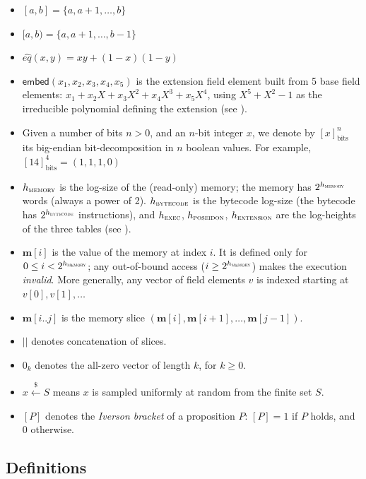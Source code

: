 \documentclass{article}
\theoremstyle{definition}
\begin{document}
\begin{itemize}
    \item $[a, b] = \{a, a + 1, \ldots, b\}$
    \item $[a, b) = \{a, a + 1, \ldots, b-1\}$
    \item $\hat{eq}(x, y) = x y + (1 - x)(1 - y)$
    \item \label{sec:preliminaries-embed} $\mathsf{embed}(x_1, x_2, x_3, x_4, x_5)$ is the extension field element built from 5 base field elements: $x_1 + x_2 X + x_3 X^2 + x_4 X^3 + x_5 X^4$, using $X^5 + X^2 - 1$ as the irreducible polynomial defining the extension (see ).
    \item Given a number of bits $n > 0$, and an $n$-bit integer $x$, we denote by $[x]_\text{bits}^n$ its big-endian bit-decomposition in $n$ boolean values. For example, $[14]_\text{bits}^4 = (1, 1, 1, 0)$
    \item $h_\textsc{memory}$ is the log-size of the (read-only) memory; the memory has $2^{h_\textsc{memory}}$ words (always a power of 2). $h_\textsc{bytecode}$ is the bytecode log-size (the bytecode has $2^{h_\textsc{bytecode}}$ instructions), and $h_\textsc{exec}$, $h_\textsc{poseidon}$, $h_\textsc{extension}$ are the log-heights of the three tables (see ).
    \item $\textbf{m}[i]$ is the value of the memory at index $i$. It is defined only for $0 \leq i < 2^{h_\textsc{memory}}$; any out-of-bound access ($i \geq 2^{h_\textsc{memory}}$) makes the execution \emph{invalid}. More generally, any vector of field elements $v$ is indexed starting at $v[0], v[1], \dots$
    \item $\textbf{m}[i..j]$ is the memory slice $(\textbf{m}[i], \textbf{m}[i+1], \ldots, \textbf{m}[j-1])$.
    \item $||$ denotes concatenation of slices.
    \item $0_k$ denotes the all-zero vector of length $k$, for $k \geq 0$.
    \item $x \overset{\$}{\leftarrow} S$ means $x$ is sampled uniformly at random from the finite set $S$.
    \item $[P]$ denotes the \emph{Iverson bracket} of a proposition $P$: $[P] = 1$ if $P$ holds, and $0$ otherwise.
\end{itemize}

\subsection{Definitions}
\end{document}
